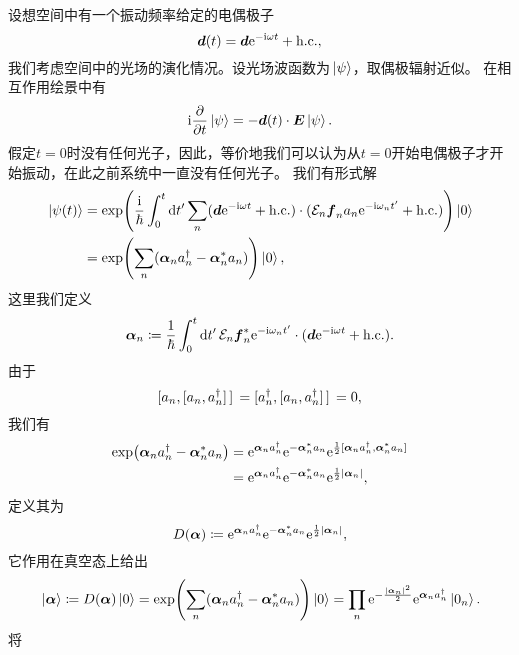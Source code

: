 设想空间中有一个振动频率给定的电偶极子
\begin{equation}
    \vb*{d}(t) = \vb*{d} \mathrm{e}^{- \mathrm{i} \omega t } + \text{h.c.},
\end{equation}
我们考虑空间中的光场的演化情况。设光场波函数为$\ket*{\psi}$，取偶极辐射近似。
在相互作用绘景中有
\begin{equation}
    \mathrm{i} \pdv{t} \ket*{\psi} = - \vb*{d}(t) \cdot \vb*{E} \ket*{\psi}.
\end{equation}
假定$t=0$时没有任何光子，因此，等价地我们可以认为从$t=0$开始电偶极子才开始振动，在此之前系统中一直没有任何光子。
我们有形式解
\[
    \begin{aligned}
        \ket*{\psi(t)} &= \exp(\frac{\mathrm{i}}{\hbar} \int_0^t \dd{t'} \sum_n (\vb*{d} \mathrm{e}^{- \mathrm{i} \omega t } + \text{h.c.}) \cdot (\mathcal{E}_n \vb*{f}_n a_n \mathrm{e}^{- \mathrm{i} \omega_n t'} + \text{h.c.}) ) \ket*{0} \\
        &= \exp(\sum_n (\vb*{\alpha}_n a_n^\dagger - \vb*{\alpha}_n^* a_n) ) \ket*{0},
    \end{aligned}
\]
这里我们定义
\begin{equation}
    \vb*{\alpha}_n \coloneqq \frac{1}{\hbar} \int_0^t \dd{t'} \mathcal{E}_n \vb*{f}_n^* \mathrm{e}^{-\mathrm{i} \omega_n t'} \cdot (\vb*{d} \mathrm{e}^{- \mathrm{i} \omega t} + \text{h.c.}).
\end{equation}
由于
\[
    \comm*{a_n}{\comm*{a_n}{a^\dagger_n}} = \comm*{a^\dagger_n}{\comm*{a_n}{a^\dagger_n}} = 0,
\]
我们有
\[
    \begin{aligned}
        \exp(\vb*{\alpha}_n a_n^\dagger - \vb*{\alpha}_n^* a_n) &= \ee^{\vb*{\alpha}_n a_n^\dagger} \ee^{- \vb*{\alpha}_n^* a_n} \ee^{\frac{1}{2} \comm*{\vb*{\alpha}_n a_n^\dagger}{\vb*{\alpha}_n^* a_n}} \\
        &= \ee^{\vb*{\alpha}_n a_n^\dagger} \ee^{- \vb*{\alpha}_n^* a_n} \ee^{\frac{1}{2} \abs{\vb*{\alpha}_n}},
    \end{aligned}
\]
定义其为
\begin{equation}
    D(\vb*{\alpha}) \coloneqq \mathrm{e}^{\vb*{\alpha}_n a_n^\dagger} \mathrm{e}^{- \vb*{\alpha}_n^* a_n} \mathrm{e}^{\frac{1}{2} \abs{\vb*{\alpha}_n}},
\end{equation}
它作用在真空态上给出
\begin{equation}
    \ket*{\vb*{\alpha}} \coloneqq D(\vb*{\alpha}) \ket*{0} = \exp(\sum_n (\vb*{\alpha}_n a_n^\dagger - \vb*{\alpha}_n^* a_n) ) \ket*{0} = \prod_n \mathrm{e}^{- \frac{\abs{\vb*{\alpha}_n}^2}{2}} \mathrm{e}^{\vb*{\alpha}_n a^\dagger_n} \ket*{0_n}.
\end{equation}
将

